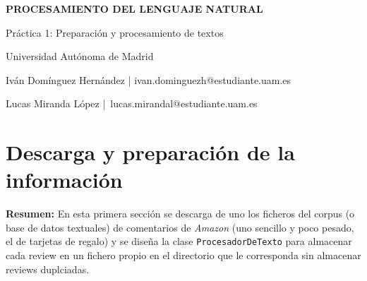 \documentclass[10pt,a4paper]{article}
\begin{document}
\begin{titlepage}
    \centering
    
    \vfill
    {\huge \textbf{PROCESAMIENTO DEL LENGUAJE NATURAL} \par}
    \vspace{2cm}
    {\Large Práctica 1: Preparación y procesamiento de textos \par}
    \vspace{1cm}
    {\Large Universidad Autónoma de Madrid \par}
    \vspace{1cm}
    {\large Iván Domínguez Hernández |  ivan.dominguezh@estudiante.uam.es \par}
    \vspace{.5cm}
    {\large Lucas Miranda López | lucas.mirandal@estudiante.uam.es \par}
    \vspace{1cm}
\end{titlepage}


\tableofcontents

\newpage

\section{Descarga y preparación de la información}
\label{sec-1}

\noindent \textbf{Resumen:} En esta primera sección se descarga de uno los ficheros del corpus (o base de datos textuales) 
de comentarios de \textit{Amazon} (uno sencillo y poco pesado, el de tarjetas de regalo) y se diseña la clase 
\texttt{ProcesadorDeTexto} para almacenar cada review en un fichero propio en el directorio que le corresponda sin almacenar 
reviews duplciadas. 
\end{document}
